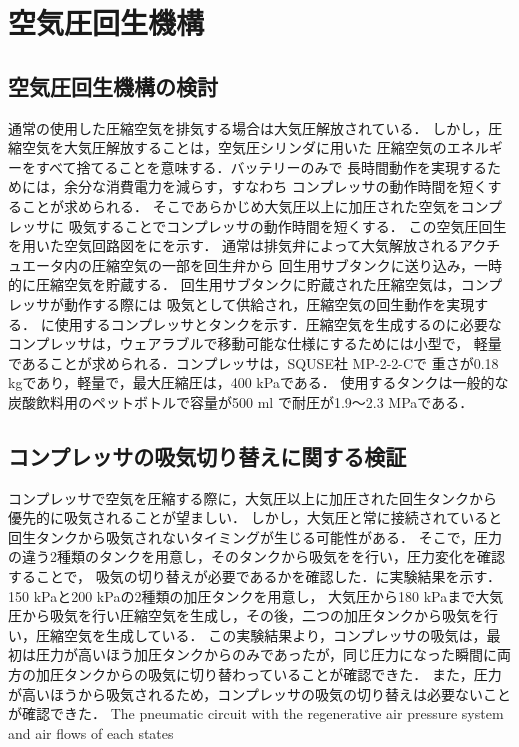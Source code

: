 \section{空気圧回生機構}
\subsection{空気圧回生機構の検討}
通常の使用した圧縮空気を排気する場合は大気圧解放されている．
しかし，圧縮空気を大気圧解放することは，空気圧シリンダに用いた
圧縮空気のエネルギーをすべて捨てることを意味する．バッテリーのみで
長時間動作を実現するためには，余分な消費電力を減らす，すなわち
コンプレッサの動作時間を短くすることが求められる．
そこであらかじめ大気圧以上に加圧された空気をコンプレッサに
吸気することでコンプレッサの動作時間を短くする．
この空気圧回生を用いた空気回路図をにを示す．
通常は排気弁によって大気解放されるアクチュエータ内の圧縮空気の一部を回生弁から
回生用サブタンクに送り込み，一時的に圧縮空気を貯蔵する．
回生用サブタンクに貯蔵された圧縮空気は，コンプレッサが動作する際には
吸気として供給され，圧縮空気の回生動作を実現する．
に使用するコンプレッサとタンクを示す．圧縮空気を生成するのに必要な
コンプレッサは，ウェアラブルで移動可能な仕様にするためには小型で，
軽量であることが求められる．コンプレッサは，SQUSE社 MP-2-2-Cで
重さが0.18 kgであり，軽量で，最大圧縮圧は，400 kPaである．
使用するタンクは一般的な炭酸飲料用のペットボトルで容量が500 ml
で耐圧が1.9～2.3 MPaである\cite{petto}．
\subsection{コンプレッサの吸気切り替えに関する検証}
コンプレッサで空気を圧縮する際に，大気圧以上に加圧された回生タンクから
優先的に吸気されることが望ましい．
しかし，大気圧と常に接続されていると回生タンクから吸気されないタイミングが生じる可能性がある．
そこで，圧力の違う2種類のタンクを用意し，そのタンクから吸気をを行い，圧力変化を確認することで，
吸気の切り替えが必要であるかを確認した．に実験結果を示す．150 kPaと200 kPaの2種類の加圧タンクを用意し，
大気圧から180 kPaまで大気圧から吸気を行い圧縮空気を生成し，その後，二つの加圧タンクから吸気を行い，圧縮空気を生成している．
この実験結果より，コンプレッサの吸気は，最初は圧力が高いほう加圧タンクからのみであったが，同じ圧力になった瞬間に両方の加圧タンクからの吸気に切り替わっていることが確認できた．
また，圧力が高いほうから吸気されるため，コンプレッサの吸気の切り替えは必要ないことが確認できた．
{The pneumatic circuit with the regenerative air
pressure system  and air flows of each states}
